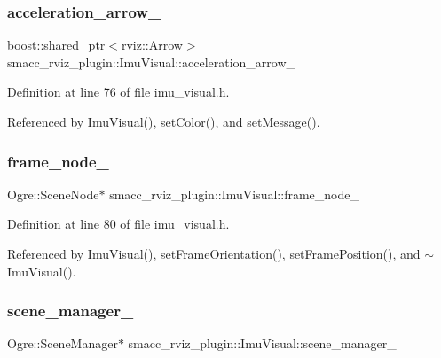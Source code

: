 \subsubsection{\texorpdfstring{acceleration\+\_\+arrow\+\_\+}{acceleration\_arrow\_}}
{\footnotesize\ttfamily boost\+::shared\+\_\+ptr$<$rviz\+::\+Arrow$>$ smacc\+\_\+rviz\+\_\+plugin\+::\+Imu\+Visual\+::acceleration\+\_\+arrow\+\_\+\hspace{0.3cm}{\ttfamily [private]}}



Definition at line 76 of file imu\+\_\+visual.\+h.



Referenced by Imu\+Visual(), set\+Color(), and set\+Message().

\mbox{\label{classsmacc__rviz__plugin_1_1ImuVisual_ae41316c00ac89e1e0ee0adf62da10841}} 
\subsubsection{\texorpdfstring{frame\+\_\+node\+\_\+}{frame\_node\_}}
{\footnotesize\ttfamily Ogre\+::\+Scene\+Node$\ast$ smacc\+\_\+rviz\+\_\+plugin\+::\+Imu\+Visual\+::frame\+\_\+node\+\_\+\hspace{0.3cm}{\ttfamily [private]}}



Definition at line 80 of file imu\+\_\+visual.\+h.



Referenced by Imu\+Visual(), set\+Frame\+Orientation(), set\+Frame\+Position(), and $\sim$\+Imu\+Visual().

\mbox{\label{classsmacc__rviz__plugin_1_1ImuVisual_acef4dba58d14224192bbed7eabbd6cbb}} 
\subsubsection{\texorpdfstring{scene\+\_\+manager\+\_\+}{scene\_manager\_}}
{\footnotesize\ttfamily Ogre\+::\+Scene\+Manager$\ast$ smacc\+\_\+rviz\+\_\+plugin\+::\+Imu\+Visual\+::scene\+\_\+manager\+\_\+\hspace{0.3cm}{\ttfamily [private]}}



